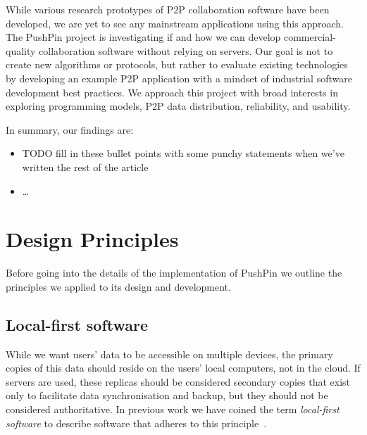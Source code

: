 \documentclass[sigplan,10pt]{acmart}
\begin{document}

While various research prototypes of P2P collaboration software have been developed, we are yet to see any mainstream applications using this approach.
The PushPin project is investigating if and how we can develop commercial-quality collaboration software without relying on servers.
Our goal is not to create new algorithms or protocols, but rather to evaluate existing technologies by developing an example P2P application with a mindset of industrial software development best practices.
We approach this project with broad interests in exploring programming models, P2P data distribution, reliability, and usability.

In summary, our findings are:
\begin{itemize}
    \item TODO fill in these bullet points with some punchy statements when we've written the rest of the article
    \item \dots
\end{itemize}




\section{Design Principles}

Before going into the details of the implementation of PushPin we outline the principles we applied to its design and development.

\subsection{Local-first software}

While we want users' data to be accessible on multiple devices, the primary copies of this data should reside on the users' local computers, not in the cloud.
If servers are used, these replicas should be considered secondary copies that exist only to facilitate data synchronisation and backup, but they should not be considered authoritative.
In previous work we have coined the term \emph{local-first software} to describe software that adheres to this principle~\cite{LocalFirst}.
\end{document}

